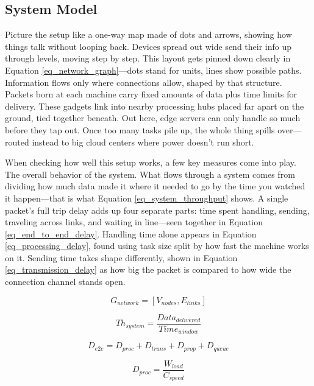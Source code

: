 \documentclass[a4paper,fleqn]{cas-dc}
\numberwithin{equation}{section}
\begin{document}
\subsection{System Model}

Picture the setup like a one-way map made of dots and arrows, showing how things talk without looping back. Devices spread out wide send their info up through levels, moving step by step. This layout gets pinned down clearly in Equation \ref{eq_network_graph}—dots stand for units, lines show possible paths. Information flows only where connections allow, shaped by that structure. Packets born at each machine carry fixed amounts of data plus time limits for delivery. These gadgets link into nearby processing hubs placed far apart on the ground, tied together beneath. Out here, edge servers can only handle so much before they tap out. Once too many tasks pile up, the whole thing spills over—routed instead to big cloud centers where power doesn't run short.

When checking how well this setup works, a few key measures come into play. The overall behavior of the system. What flows through a system comes from dividing how much data made it where it needed to go by the time you watched it happen—that is what Equation \ref{eq_system_throughput} shows. A single packet's full trip delay adds up four separate parts: time spent handling, sending, traveling across links, and waiting in line—seen together in Equation \ref{eq_end_to_end_delay}. Handling time alone appears in Equation \ref{eq_processing_delay}, found using task size split by how fast the machine works on it. Sending time takes shape differently, shown in Equation \ref{eq_transmission_delay} as how big the packet is compared to how wide the connection channel stands open.

\begin{equation}
G_{network} = [ V_{nodes}, E_{links} ]
\label{eq_network_graph}
\end{equation}

\begin{equation}
Th_{system} = \frac{Data_{delivered}}{Time_{window}}
\label{eq_system_throughput}
\end{equation}

\begin{equation}
D_{e2e} = D_{proc} + D_{trans} + D_{prop} + D_{queue}
\label{eq_end_to_end_delay}
\end{equation}

\begin{equation}
D_{proc} = \frac{W_{load}}{C_{speed}}
\label{eq_processing_delay}
\end{equation}
\end{document}
